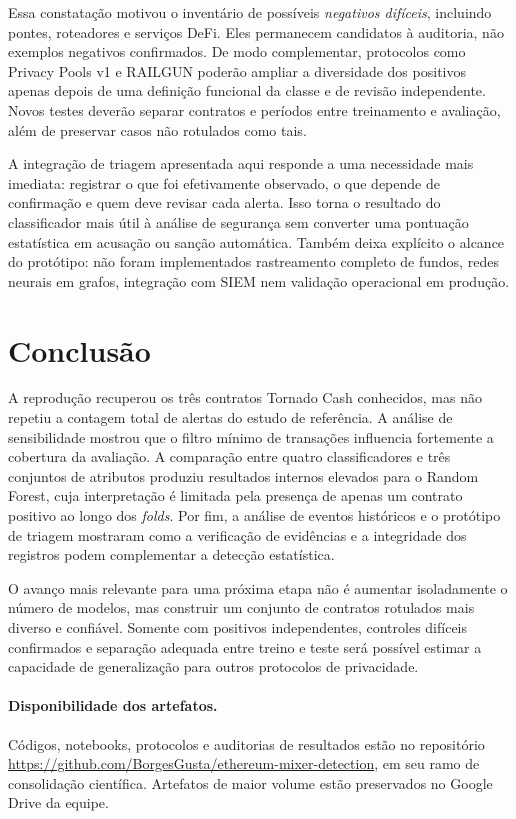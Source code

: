 \documentclass[12pt,a4paper]{article}
\begin{document}
Essa constatação motivou o inventário de possíveis \emph{negativos difíceis}, incluindo pontes, roteadores e serviços DeFi. Eles permanecem candidatos à auditoria, não exemplos negativos confirmados. De modo complementar, protocolos como Privacy Pools v1 e RAILGUN poderão ampliar a diversidade dos positivos apenas depois de uma definição funcional da classe e de revisão independente. Novos testes deverão separar contratos e períodos entre treinamento e avaliação, além de preservar casos não rotulados como tais.

A integração de triagem apresentada aqui responde a uma necessidade mais imediata: registrar o que foi efetivamente observado, o que depende de confirmação e quem deve revisar cada alerta. Isso torna o resultado do classificador mais útil à análise de segurança sem converter uma pontuação estatística em acusação ou sanção automática. Também deixa explícito o alcance do protótipo: não foram implementados rastreamento completo de fundos, redes neurais em grafos, integração com SIEM nem validação operacional em produção.

\section{Conclusão}
A reprodução recuperou os três contratos Tornado Cash conhecidos, mas não repetiu a contagem total de alertas do estudo de referência. A análise de sensibilidade mostrou que o filtro mínimo de transações influencia fortemente a cobertura da avaliação. A comparação entre quatro classificadores e três conjuntos de atributos produziu resultados internos elevados para o Random Forest, cuja interpretação é limitada pela presença de apenas um contrato positivo ao longo dos \emph{folds}. Por fim, a análise de eventos históricos e o protótipo de triagem mostraram como a verificação de evidências e a integridade dos registros podem complementar a detecção estatística.

O avanço mais relevante para uma próxima etapa não é aumentar isoladamente o número de modelos, mas construir um conjunto de contratos rotulados mais diverso e confiável. Somente com positivos independentes, controles difíceis confirmados e separação adequada entre treino e teste será possível estimar a capacidade de generalização para outros protocolos de privacidade.

\paragraph{Disponibilidade dos artefatos.} Códigos, notebooks, protocolos e auditorias de resultados estão no repositório \url{https://github.com/BorgesGusta/ethereum-mixer-detection}, em seu ramo de consolidação científica. Artefatos de maior volume estão preservados no Google Drive da equipe.
\end{document}
